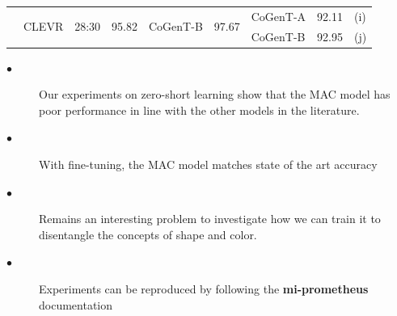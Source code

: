 \documentclass[final,paperwidth=36in,paperheight=48in,portrait,fontscale=0.36]{baposter}
\begin{document}
\begin{poster}
{\begin{table}[H]
{\begin{tabular}{lllllllll}
		\cmidrule{2-4} \cmidrule{5-6} \cmidrule{7-8} 
		& \multirow{2}{*}{CLEVR}  & \multirow{2}{*}{28:30}  & \multirow{2}{*}{95.82} &   \multirow{2}{*}{CoGenT-B}         &       \multirow{2}{*}{97.67}          & CoGenT-A &  92.11       & (i) \\
		\cmidrule{7-8} 
		&                             &                                         &       &         &                & CoGenT-B &    92.95    & (j)  \\  		
		
		
		\bottomrule
		
	
	\end{tabular}}
	\label{tab:data_properties}
\end{table}


\begin{description}
	\item[$\bullet$] Our experiments on zero-short learning show that the MAC model has poor performance in line with
	the other models in the literature.
	\item[$\bullet$] With fine-tuning, the MAC model matches state of
	the art accuracy
	\item[$\bullet$]Remains an interesting problem to investigate how we can train it to disentangle the concepts of shape and color.
	\item[$\bullet$] Experiments can be reproduced by following the \textbf{mi-prometheus}  documentation
\end{description}

}



\end{poster}
\end{document}
